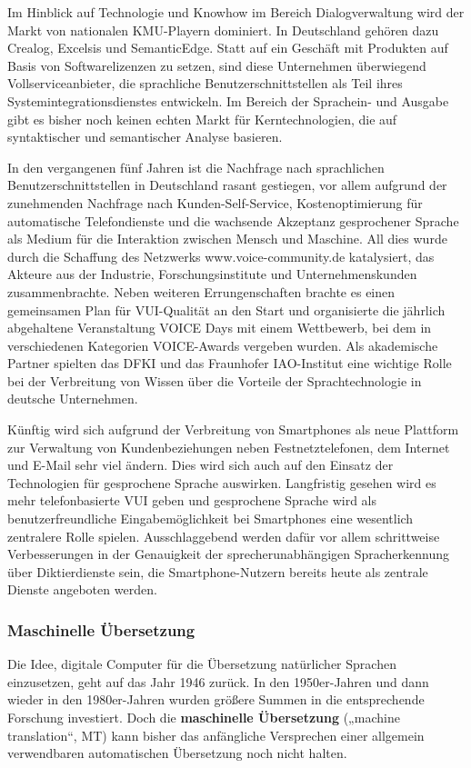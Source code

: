 \documentclass[]{../../metanetpaper}
\begin{document}
\begin{multicols}{2}
Im Hinblick auf Technologie und Knowhow im Bereich Dialogverwaltung wird der Markt von nationalen KMU-Playern dominiert. In Deutschland gehören dazu Crealog, Excelsis und SemanticEdge. Statt auf ein Geschäft mit Produkten auf Basis von Softwarelizenzen zu setzen, sind diese Unternehmen überwiegend Vollserviceanbieter, die sprachliche Benutzerschnittstellen als Teil ihres Systemintegrationsdienstes entwickeln. Im Bereich der Sprachein- und Ausgabe gibt es bisher noch keinen echten Markt für Kerntechnologien, die auf syntaktischer und semantischer Analyse basieren.

In den vergangenen fünf Jahren ist die Nachfrage nach sprachlichen Benutzerschnittstellen in Deutschland rasant gestiegen, vor allem aufgrund der zunehmenden Nachfrage nach Kunden-Self-Service, Kostenoptimierung für automatische Telefondienste und die wachsende Akzeptanz gesprochener Sprache als Medium für die Interaktion zwischen Mensch und Maschine. All dies wurde durch die Schaffung des Netzwerks www.voice-community.de katalysiert, das Akteure aus der Industrie, Forschungsinstitute und Unternehmenskunden zusammenbrachte. Neben weiteren Errungenschaften brachte es einen gemeinsamen Plan für VUI-Qualität an den Start und organisierte die jährlich abgehaltene Veranstaltung VOICE Days mit einem Wettbewerb, bei dem in verschiedenen Kategorien VOICE-Awards vergeben wurden. Als akademische Partner spielten das DFKI und das Fraunhofer IAO-Institut eine wichtige Rolle bei der Verbreitung von Wissen über die Vorteile der Sprachtechnologie in deutsche Unternehmen.

Künftig wird sich aufgrund der Verbreitung von Smartphones als neue Plattform zur Verwaltung von Kundenbeziehungen neben Festnetztelefonen, dem Internet und E-Mail sehr viel ändern. Dies wird sich auch auf den Einsatz der Technologien für gesprochene Sprache auswirken. Langfristig gesehen wird es mehr telefonbasierte VUI geben und gesprochene Sprache wird als benutzerfreundliche Eingabemöglichkeit bei Smartphones eine wesentlich zentralere Rolle spielen. Ausschlaggebend werden dafür vor allem schrittweise Verbesserungen in der Genauigkeit der sprecherunabhängigen Spracherkennung über Diktierdienste sein, die Smartphone-Nutzern bereits heute als zentrale Dienste angeboten werden.

\subsubsection{Maschinelle Übersetzung}

Die Idee, digitale Computer für die Übersetzung natürlicher Sprachen einzusetzen, geht auf das Jahr 1946 zurück. In den 1950er-Jahren und dann wieder in den 1980er-Jahren wurden größere Summen in die entsprechende Forschung investiert. Doch die \textbf{maschinelle Übersetzung} („machine translation“, MT) kann bisher das anfängliche Versprechen einer allgemein verwendbaren automatischen Übersetzung noch nicht halten.


\end{multicols}
\end{document}
